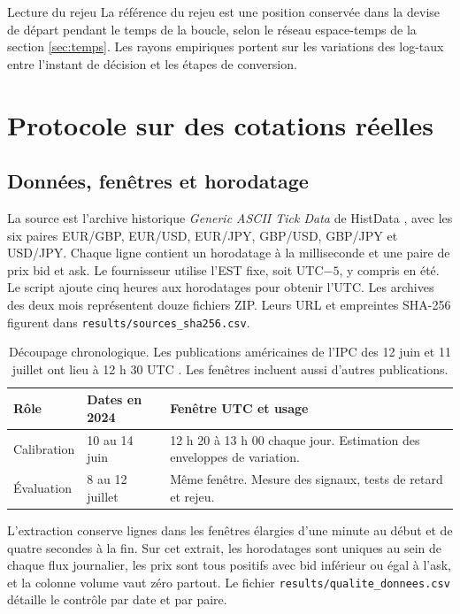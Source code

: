 \documentclass[11pt,a4paper]{article}
\theoremstyle{clair}
\newcommand{\filepath}[1]{\nolinkurl{#1}}
\begin{document}
\begin{callout}{Lecture du rejeu}
La référence du rejeu est une position conservée dans la devise de départ pendant le temps de la boucle, selon le réseau espace-temps de la section \ref{sec:temps}. Les rayons empiriques portent sur les variations des log-taux entre l'instant de décision et les étapes de conversion.
\end{callout}

\clearpage
\section{Protocole sur des cotations réelles}
\label{sec:protocole}

\subsection{Données, fenêtres et horodatage}

La source est l'archive historique \emph{Generic ASCII Tick Data} de HistData \cite{histdata,histformat}, avec les six paires EUR/GBP, EUR/USD, EUR/JPY, GBP/USD, GBP/JPY et USD/JPY. Chaque ligne contient un horodatage à la milliseconde et une paire de prix bid et ask. Le fournisseur utilise l'EST fixe, soit UTC$-5$, y compris en été. Le script ajoute cinq heures aux horodatages pour obtenir l'UTC. Les archives des deux mois représentent douze fichiers ZIP. Leurs URL et empreintes SHA-256 figurent dans \filepath{results/sources_sha256.csv}.

\begin{table}[H]
\centering\small
\begin{tabularx}{\textwidth}{@{}p{}p{}Y@{}}
\toprule
\textbf{Rôle} & \textbf{Dates en 2024} & \textbf{Fenêtre UTC et usage}\\
\midrule
Calibration & 10 au 14 juin & 12 h 20 à 13 h 00 chaque jour. Estimation des enveloppes de variation.\\
Évaluation & 8 au 12 juillet & Même fenêtre. Mesure des signaux, tests de retard et rejeu.\\
\bottomrule
\end{tabularx}
\caption{Découpage chronologique. Les publications américaines de l'IPC des 12 juin et 11 juillet ont lieu à 12 h 30 UTC \cite{blsjune,blsjuly}. Les fenêtres incluent aussi d'autres publications.}
\end{table}

L'extraction conserve \TicksSource{} lignes dans les fenêtres élargies d'une minute au début et de quatre secondes à la fin. Sur cet extrait, les horodatages sont uniques au sein de chaque flux journalier, les prix sont tous positifs avec bid inférieur ou égal à l'ask, et la colonne volume vaut zéro partout. Le fichier \filepath{results/qualite_donnees.csv} détaille le contrôle par date et par paire.
\end{document}
